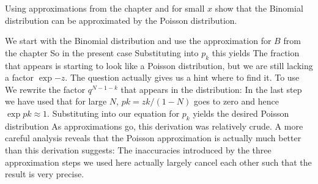 
Using approximations from the chapter and 
for small $x$ show that the Binomial distribution can be approximated by the Poisson distribution. 

\solution
We start with the Binomial distribution 
and use the approximation for $B$ from the chapter
So in the present case 
Substituting into $p_k$ this yields 
The fraction that appears is starting to look like a Poisson distribution, but we are still lacking a factor $\exp{-z}$. The question actually gives us a hint where to find it. To use
We rewrite the factor $q^{N-1-k}$ that appears in the distribution: 
In the last step we have used that for large $N$, $pk=zk/(1-N)$ goes to zero and hence $\exp{pk}\approx 1$. Substituting 
into our equation for $p_k$ yields the desired Poisson distribution
As approximations go, this derivation was relatively crude. A more careful analysis reveals that the Poisson approximation is actually much better than this derivation suggests: The inaccuracies introduced by the three approximation steps we used here actually largely cancel each other such that the result is very precise.    
